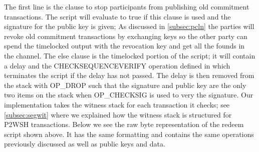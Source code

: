 The first line is the clause to stop participants from publishing old commitment transactions. The script will evaluate to true if this clause is used and the signature for the public key is given; As discussed in \cref{subsec:pcln} the parties will revoke old commitment transactions by exchanging keys so the other party can spend the timelocked output with the revocation key and get all the founds in the channel. The else clause is the timelocked portion of the script; it will contain a delay and the CHECKSEQUENCEVERIFY operation defined in \cite{BIP112} which terminates the script if the delay has not passed. The delay is then removed from the stack with OP\_DROP such that the signature and public key are the only two items on the stack when OP\_CHECKSIG is used to very the signature.
Our implementation takes the witness stack for each transaction it checks; see \cref{subsec:segwit} where we explained how the witness stack is structured for P2WSH transactions. Below we see the raw byte representation of the redeem script shown above. It has the same formatting and contains the same operations previously discussed as well as public keys and data.
\\

\\

